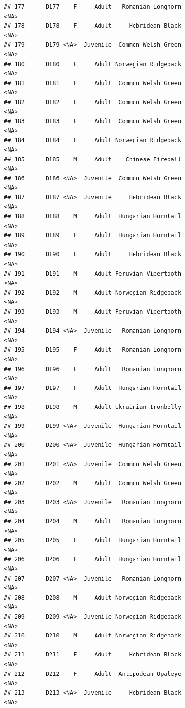 \documentclass[
]{book}
\begin{document}
\begin{verbatim}
## 177      D177    F     Adult   Romanian Longhorn                <NA>
## 178      D178    F     Adult     Hebridean Black                <NA>
## 179      D179 <NA>  Juvenile  Common Welsh Green                <NA>
## 180      D180    F     Adult Norwegian Ridgeback                <NA>
## 181      D181    F     Adult  Common Welsh Green                <NA>
## 182      D182    F     Adult  Common Welsh Green                <NA>
## 183      D183    F     Adult  Common Welsh Green                <NA>
## 184      D184    F     Adult Norwegian Ridgeback                <NA>
## 185      D185    M     Adult    Chinese Fireball                <NA>
## 186      D186 <NA>  Juvenile  Common Welsh Green                <NA>
## 187      D187 <NA>  Juvenile     Hebridean Black                <NA>
## 188      D188    M     Adult  Hungarian Horntail                <NA>
## 189      D189    F     Adult  Hungarian Horntail                <NA>
## 190      D190    F     Adult     Hebridean Black                <NA>
## 191      D191    M     Adult Peruvian Vipertooth                <NA>
## 192      D192    M     Adult Norwegian Ridgeback                <NA>
## 193      D193    M     Adult Peruvian Vipertooth                <NA>
## 194      D194 <NA>  Juvenile   Romanian Longhorn                <NA>
## 195      D195    F     Adult   Romanian Longhorn                <NA>
## 196      D196    F     Adult   Romanian Longhorn                <NA>
## 197      D197    F     Adult  Hungarian Horntail                <NA>
## 198      D198    M     Adult Ukrainian Ironbelly                <NA>
## 199      D199 <NA>  Juvenile  Hungarian Horntail                <NA>
## 200      D200 <NA>  Juvenile  Hungarian Horntail                <NA>
## 201      D201 <NA>  Juvenile  Common Welsh Green                <NA>
## 202      D202    M     Adult  Common Welsh Green                <NA>
## 203      D203 <NA>  Juvenile   Romanian Longhorn                <NA>
## 204      D204    M     Adult   Romanian Longhorn                <NA>
## 205      D205    F     Adult  Hungarian Horntail                <NA>
## 206      D206    F     Adult  Hungarian Horntail                <NA>
## 207      D207 <NA>  Juvenile   Romanian Longhorn                <NA>
## 208      D208    M     Adult Norwegian Ridgeback                <NA>
## 209      D209 <NA>  Juvenile Norwegian Ridgeback                <NA>
## 210      D210    M     Adult Norwegian Ridgeback                <NA>
## 211      D211    F     Adult     Hebridean Black                <NA>
## 212      D212    F     Adult  Antipodean Opaleye                <NA>
## 213      D213 <NA>  Juvenile     Hebridean Black                <NA>

\end{verbatim}
\end{document}
